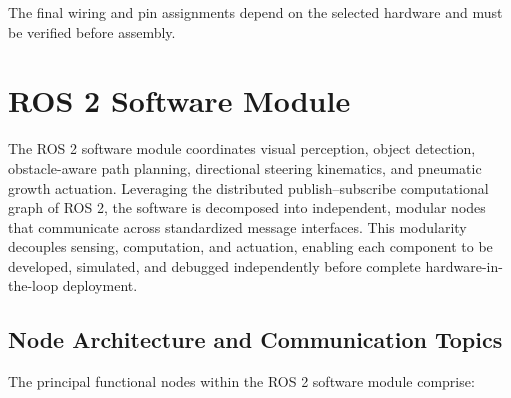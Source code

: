 The final wiring and pin assignments depend on the selected hardware and must be verified before assembly.

\section{ROS 2 Software Module}

The ROS 2 software module coordinates visual perception, object detection, obstacle-aware path planning, directional steering kinematics, and pneumatic growth actuation. Leveraging the distributed publish--subscribe computational graph of ROS 2, the software is decomposed into independent, modular nodes that communicate across standardized message interfaces. This modularity decouples sensing, computation, and actuation, enabling each component to be developed, simulated, and debugged independently before complete hardware-in-the-loop deployment.

\subsection{Node Architecture and Communication Topics}
The principal functional nodes within the ROS 2 software module comprise:

